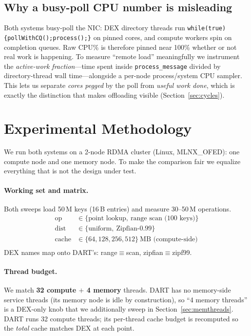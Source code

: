 \documentclass[sigconf,nonacm]{acmart}
\begin{document}
\subsection{Why a busy-poll CPU number is misleading}
Both systems busy-poll the NIC: DEX directory threads run
\texttt{while(true)\{pollWithCQ();process();\}} on pinned cores, and compute
workers spin on completion queues. Raw CPU\% is therefore pinned near 100\%
whether or not real work is happening. To measure ``remote load'' meaningfully we
instrument the \emph{active-work fraction}---time spent inside
\texttt{process\_message} divided by directory-thread wall time---alongside a
per-node process/system CPU sampler. This lets us separate \emph{cores pegged} by
the poll from \emph{useful work done}, which is exactly the distinction that
makes offloading visible (Section~\ref{sec:cycles}).

\section{Experimental Methodology}
\label{sec:method}
We run both systems on a 2-node RDMA cluster (Linux, MLNX\_OFED): one compute
node and one memory node. To make the comparison fair we equalize everything that
is not the design under test.

\paragraph{Working set and matrix.}
Both sweeps load 50\,M keys (16\,B entries) and measure 30--50\,M operations.
\[
\begin{array}{ll}
\text{op}    & \in \{\text{point lookup},\ \text{range scan (100 keys)}\}\\
\text{dist}  & \in \{\text{uniform},\ \text{Zipfian-}0.99\}\\
\text{cache} & \in \{64, 128, 256, 512\}\ \text{MB (compute-side)}\\
\end{array}
\]
DEX names map onto DART's: \textsf{range}$\equiv$\textsf{scan},
\textsf{zipfian}$\equiv$\textsf{zipf99}.

\paragraph{Thread budget.}
We match \textbf{32 compute $+$ 4 memory} threads. DART has no memory-side
service threads (its memory node is idle by construction), so ``4 memory
threads'' is a DEX-only knob that we additionally sweep in
Section~\ref{sec:memthreads}. DART runs 32 compute threads; its per-thread cache
budget is recomputed so the \emph{total} cache matches DEX at each point.
\end{document}
